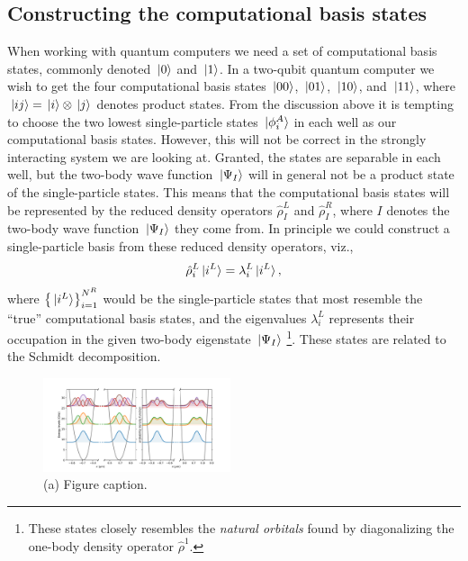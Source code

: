 \documentclass[twocolumn,superscriptaddress,unsortedaddress,
 amsmath,amssymb,
 aps,
]{revtex4-2}
\begin{document}
    \subsection{Constructing the computational basis states}
        When working with quantum computers we need a set of computational
        basis states, commonly denoted $\ket*{0}$ and $\ket*{1}$.
        In a two-qubit quantum computer we wish to get the four computational
        basis states $\ket*{00}$, $\ket*{01}$, $\ket*{10}$, and $\ket*{11}$,
        where $\ket*{ij} = \ket*{i} \otimes \ket*{j}$ denotes product states.
        From the discussion above it is tempting to choose the two lowest
        single-particle states $\ket*{\phi^{A}_i}$ in each well as our
        computational basis states.
        However, this will not be correct in the strongly interacting system
        we are looking at.
        Granted, the states are separable in each well, but the two-body
        wave function $\ket*{\Psi_I}$ will in general not be a product state
        of the single-particle states.
        This means that the computational basis states will be represented by
        the reduced density operators $\hat{\rho}^L_I$ and $\hat{\rho}^R_I$,
        where $I$ denotes the two-body wave function $\ket*{\Psi_I}$ they
        come from.
        In principle we could construct a single-particle basis from these
        reduced density operators, viz.,
        \begin{align*}
            \hat{\rho}^L_i \ket*{i^L}
            = \lambda^L_i \ket*{i^L},
        \end{align*}
        where $\qty{\ket*{i^L}}_{i = 1}^{N^R}$ would be the single-particle
        states that most resemble the ``true'' computational basis states,
        and the eigenvalues $\lambda^L_i$ represents their occupation
        in the given two-body eigenstate $\ket*{\Psi_I}$ \footnote{
            These states closely resembles the \emph{natural orbitals}
            found by diagonalizing the one-body density operator $\hat{\rho}^1$.
        }.
        These states are related to the Schmidt decomposition.
 

        
\begin{figure}
\includegraphics[width=0.49\textwidth]{figure2.pdf}
\caption{\label{fig2} (a) Figure caption.}
\end{figure}
\end{document}
